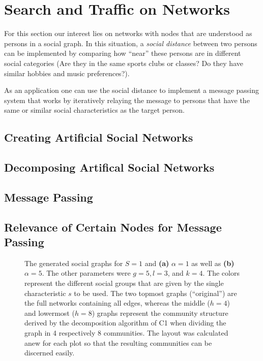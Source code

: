 \documentclass{scrartcl}
\begin{document}
\section{Search and Traffic on Networks}
For this section our interest lies on networks with nodes that are
understood as persons in a social graph. In this situation, a \emph{social
distance} between two persons can be implemented by comparing how
\enquote{near} these persons are in different social categories
(Are they in the same sports clubs or classes? Do they have similar hobbies
and music preferences?). 

As an application one can use the social distance
to implement a message passing system that works by iteratively relaying
the message to persons that have the same or similar social characteristics
as the target person.

\subsection{Creating Artificial Social Networks}
\subsection{Decomposing Artifical Social Networks}
\subsection{Message Passing}
\subsection{Relevance of Certain Nodes for Message Passing}


\begin{figure}
    \centering
    \def\svgwidth{0.9\textwidth}
    
    \caption{The generated social graphs for $S=1$ and \textbf{(a)} $\alpha = 1$
    as well as \textbf{(b)} $\alpha = 5$. The other parameters were $g = 5,
    l = 3$, and $k = 4$. The colors represent the different
    social groups that are given by the single characteristic $s$ to be
    used.  The two topmost graphs (\enquote{original}) are the full
    networks containing all edges, whereas the middle ($h = 4$) and
    lowermost ($h=8$) graphs represent the community structure derived by
    the decomposition algorithm of C1 when dividing the graph in
    4 respectively 8 communities.
    The layout was calculated anew for each plot so that the resulting
    communities can be discerned easily.}
    \label{fig:331}
\end{figure}
\end{document}
